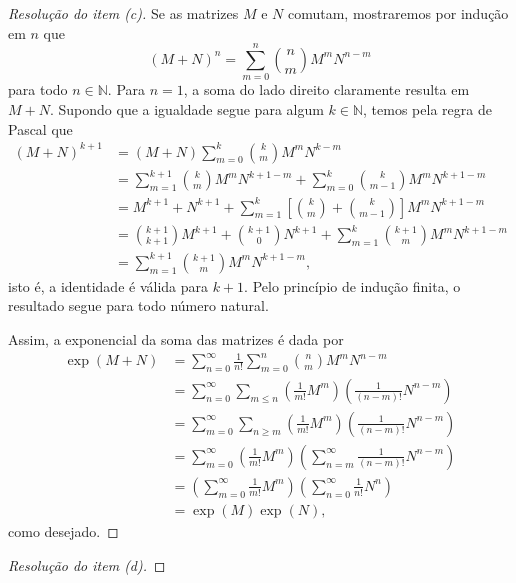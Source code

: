 \begin{proof}[Resolução do item (c)]
    Se as matrizes \(M\) e \(N\) comutam, mostraremos por indução em \(n\) que
    \begin{equation*}
        (M + N)^n = \sum_{m = 0}^{n} \binom{n}{m} M^m N^{n-m}
    \end{equation*}
    para todo \(n \in \mathbb{N}\). Para \(n = 1\), a soma do lado direito claramente resulta em \(M + N\). Supondo que a igualdade segue para algum \(k \in \mathbb{N}\), temos pela regra de Pascal que
    \begin{align*}
        (M+N)^{k+1} &= (M+N)\sum_{m=0}^k\binom{k}{m} M^m N^{k-m}\\
                    &= \sum_{m = 1}^{k+1} \binom{k}{m} M^m N^{k+1-m} + \sum_{m=0}^{k} \binom{k}{m-1} M^m N^{k+1-m}\\
                    &= M^{k+1} + N^{k+1} + \sum_{m=1}^{k} \left[\binom{k}{m} + \binom{k}{m-1}\right] M^m N^{k+1-m}\\
                    &= \binom{k+1}{k+1} M^{k+1} + \binom{k+1}{0}N^{k+1} + \sum_{m=1}^{k} \binom{k+1}{m} M^m N^{k+1-m}\\
                    &= \sum_{m=1}^{k+1} \binom{k+1}{m} M^m N^{k+1 - m},
    \end{align*}
    isto é, a identidade é válida para \(k+1\). Pelo princípio de indução finita, o resultado segue para todo número natural.

    Assim, a exponencial da soma das matrizes é dada por
    \begin{align*}
        \exp(M+N) &= \sum_{n = 0}^\infty \frac{1}{n!} \sum_{m=0}^n \binom{n}{m} M^m N^{n - m}\\
                  &= \sum_{n=0}^\infty \sum_{m\leq n} \left(\frac{1}{m!}M^m\right) \left(\frac{1}{(n-m)!} N^{n-m}\right)\\
                  &= \sum_{m=0}^\infty \sum_{n \geq m} \left(\frac{1}{m!} M^m\right) \left(\frac{1}{(n-m)!}N^{n-m}\right)\\
                  &= \sum_{m=0}^\infty \left(\frac{1}{m!} M^m\right) \left(\sum_{n=m}^\infty \frac{1}{(n-m)!} N^{n-m}\right)\\
                  &= \left(\sum_{m=0}^\infty \frac{1}{m!} M^m\right)\left(\sum_{n= 0}^\infty \frac{1}{n!} N^n\right)\\
                  &= \exp(M)\exp(N),
    \end{align*}
    como desejado.
\end{proof}
\begin{proof}[Resolução do item (d)]

\end{proof}
